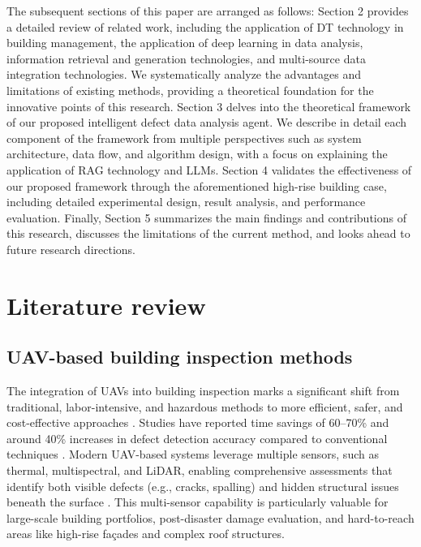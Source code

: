 \documentclass[a4paper,fleqn]{cas-sc}
\begin{document}
The subsequent sections of this paper are arranged as follows: Section 2 provides a detailed review of related work, including the application of DT technology in building management, the application of deep learning in data analysis, information retrieval and generation technologies, and multi-source data integration technologies. We systematically analyze the advantages and limitations of existing methods, providing a theoretical foundation for the innovative points of this research. Section 3 delves into the theoretical framework of our proposed intelligent defect data analysis agent. We describe in detail each component of the framework from multiple perspectives such as system architecture, data flow, and algorithm design, with a focus on explaining the application of RAG technology and LLMs. Section 4 validates the effectiveness of our proposed framework through the aforementioned high-rise building case, including detailed experimental design, result analysis, and performance evaluation. Finally, Section 5 summarizes the main findings and contributions of this research, discusses the limitations of the current method, and looks ahead to future research directions.


\section{Literature review}
\label{sec: comparison_results}

\subsection{UAV-based building inspection methods}

The integration of UAVs into building inspection marks a significant shift from traditional, labor-intensive, and hazardous methods to more efficient, safer, and cost-effective approaches \cite{zhang2022integrating}. Studies have reported time savings of 60--70\% and around 40\% increases in defect detection accuracy compared to conventional techniques \cite{falorca2021facade, ruiz2021unmanned}. Modern UAV-based systems leverage multiple sensors, such as thermal, multispectral, and LiDAR, enabling comprehensive assessments that identify both visible defects (e.g., cracks, spalling) and hidden structural issues beneath the surface \cite{kim2017concrete, jiang2020real}. This multi-sensor capability is particularly valuable for large-scale building portfolios, post-disaster damage evaluation, and hard-to-reach areas like high-rise façades and complex roof structures.
\end{document}
